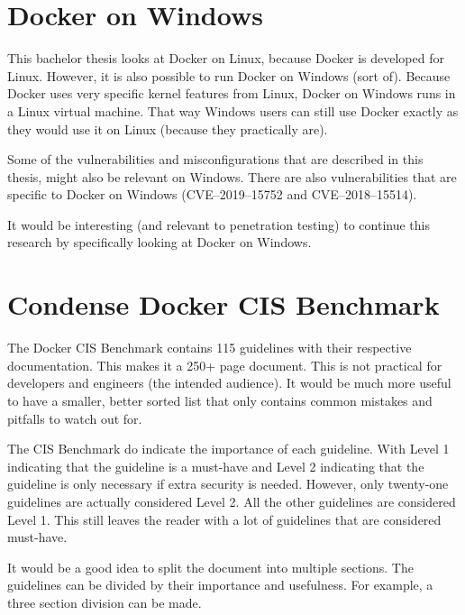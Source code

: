 \section{Docker on Windows}
This bachelor thesis looks at Docker on Linux, because Docker is developed for Linux. However, it is also possible to run Docker on Windows (sort of). Because Docker uses very specific kernel features from Linux, Docker on Windows runs in a Linux virtual machine. That way Windows users can still use Docker exactly as they would use it on Linux (because they practically are).

\hfill

Some of the vulnerabilities and misconfigurations that are described in this thesis, might also be relevant on Windows. There are also vulnerabilities that are specific to Docker on Windows (CVE--2019--15752 and CVE--2018--15514).

\hfill

It would be interesting (and relevant to penetration testing) to continue this research by specifically looking at Docker on Windows.

\section{Condense Docker CIS Benchmark}

The Docker CIS Benchmark contains 115 guidelines with their respective documentation.
This makes it a 250+ page document. This is not practical for developers and engineers (the intended audience). It would be much more useful to have a smaller, better sorted list that only contains common mistakes and pitfalls to watch out for.

\hfill

The CIS Benchmark do indicate the importance of each guideline.
With Level 1 indicating that the guideline is a must-have and Level 2 indicating that the guideline is only necessary if extra security is needed. However, only twenty-one guidelines are actually considered Level 2. All the other guidelines are considered Level 1. This still leaves the reader with a lot of guidelines that are considered must-have.

\hfill

It would be a good idea to split the document into multiple sections. The guidelines can be divided by their importance and usefulness. For example, a three section division can be made.

\hfill

